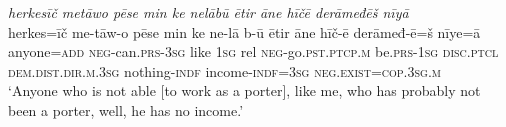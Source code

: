 \ea \label{ŽM.62}
\textit{herkesīč metāwo pēse min ke nelābū ētir āne hīčē derāmeđēš nīyā} \\ 
\gll herkes=īč me-tāw-o pēse min ke ne-lā b-ū ētir āne hīč-ē derāmeđ-ē=š nīye=ā \\ 
 anyone\textsc{=add} \textsc{neg-}can\textsc{.prs}\textsc{-3sg} like \textsc{1sg} rel \textsc{neg-}go\textsc{.pst}\textsc{.ptcp}\textsc{.m} be\textsc{.prs}\textsc{-\textsc{1sg}} \textsc{disc.ptcl} \textsc{dem.dist}\textsc{.dir}\textsc{.m}\textsc{.3sg} nothing\textsc{-indf} income\textsc{-indf}\textsc{=3sg} \textsc{\textsc{neg.}exist}\textsc{=cop}\textsc{.3sg}\textsc{.m} \\ 
\glt `Anyone who is not able [to work as a porter], like me, who has probably not been a porter, well, he has no income.'
\z 
 

